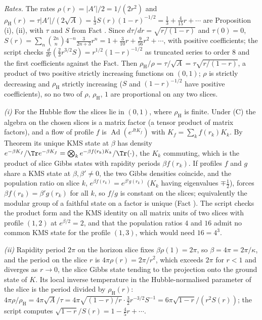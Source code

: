 \emph{Rates.} The rates $\rho(r) = |A'|/2 = 1/(2r^{2})$ and $\rho_{\mathrm{H}}(r) = \tau|A'|/(2\sqrt{A}) = \tfrac13 S(r)(1-r)^{-1/2} = \tfrac13 + \tfrac{4}{15}r + \cdots$ are Proposition (i), (ii), with $\tau$ and $S$ from Fact . Since $d\tau/dr = \sqrt{r/(1-r)}$ and $\tau(0) = 0$, $S(r) = \sum_{n}\binom{2n}{n}4^{-n}\tfrac{3}{2n+3}r^{n} = 1 + \tfrac{3}{10}r + \tfrac{9}{56}r^{2} + \cdots$, with positive coefficients; the script checks $\tfrac{d}{dr}(\tfrac23 r^{3/2}S) = r^{1/2}(1-r)^{-1/2}$ as truncated series to order $8$ and the first coefficients against the Fact. Then $\rho_{\mathrm{H}}/\rho = \tau/\sqrt{A} = \tau\sqrt{r/(1-r)}$, a product of two positive strictly increasing functions on $(0,1)$; $\rho$ is strictly decreasing and $\rho_{\mathrm{H}}$ strictly increasing ($S$ and $(1-r)^{-1/2}$ have positive coefficients), so no two of $\rho$, $\rho_{\mathrm{H}}$, $1$ are proportional on any two slices.

\emph{(i)} For the Hubble flow the slices lie in $(0,1)$, where $\rho_{\mathrm{H}}$ is finite. Under (C) the algebra on the chosen slices is a matrix factor (a tensor product of matrix factors), and a flow of profile $f$ is $\operatorname{Ad}(e^{JtK_{f}})$ with $K_{f} = \sum_{k}f(r_{k})K_{k}$. By Theorem  its unique KMS state at $\beta$ has density $e^{-\beta K_{f}}/\Tr e^{-\beta K_{f}} = \bigotimes_{k}e^{-\beta f(r_{k})K_{k}}/\Tr(\cdot)$, the $K_{k}$ commuting, which is the product of slice Gibbs states with rapidity periods $\beta f(r_{k})$. If profiles $f$ and $g$ share a KMS state at $\beta, \beta' \neq 0$, the two Gibbs densities coincide, and the population ratio on slice $k$, $e^{\beta f(r_{k})} = e^{\beta' g(r_{k})}$ ($K_{k}$ having eigenvalues $\mp\tfrac12$), forces $\beta f(r_{k}) = \beta' g(r_{k})$ for all $k$, so $f/g$ is constant on the slices; equivalently the modular group of a faithful state on a factor is unique (Fact ). The script checks the product form and the KMS identity on all matrix units of two slices with profile $(1,2)$ at $e^{\beta/2} = 2$, and that the population ratios $4$ and $16$ admit no common KMS state for the profile $(1,3)$, which would need $16 = 4^{3}$.

\emph{(ii)} Rapidity period $2\pi$ on the horizon slice fixes $\beta\rho(1) = 2\pi$, so $\beta = 4\pi = 2\pi/\kappa$, and the period on the slice $r$ is $4\pi\rho(r) = 2\pi/r^{2}$, which exceeds $2\pi$ for $r < 1$ and diverges as $r \to 0$, the slice Gibbs state tending to the projection onto the ground state of $K$. Its local inverse temperature in the Hubble-normalised parameter of the slice is the period divided by $\rho_{\mathrm{H}}(r)$: $4\pi\rho/\rho_{\mathrm{H}} = 4\pi\sqrt{A}/\tau = 4\pi\sqrt{(1-r)/r}\cdot\tfrac{3}{2}r^{-3/2}S^{-1} = 6\pi\sqrt{1-r}/(r^{2}S(r))$; the script computes $\sqrt{1-r}/S(r) = 1 - \tfrac45 r + \cdots$.

